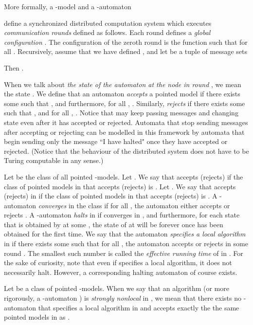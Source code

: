 \documentclass[copyright,creativecommons]{eptcs}
\begin{document}
More formally, a -model  
and a -automaton

define a
synchronized distributed computation system which executes \emph{communication
rounds} defined as follows. Each round  defines a \emph{global configuration} .
The configuration  of the zeroth round is the function  such that 
for all .
Recursively, assume that we have defined ,
and let 
be a tuple of message sets 

Then
.




When we talk about \emph{the state of the automaton  at the node  in round }, we mean
the state . We define that an automaton  \emph{accepts} a
pointed model  if there exists some 
such that , and furthermore, for all , .
Similarly,  \emph{rejects}  if there exists some 
such that , and for all , . 
Notice that  may keep passing messages and changing state even after it has accepted or rejected.
Automata that stop sending messages after accepting or rejecting can be 
modelled in this framework by automata that begin sending only the message
``I have halted" once they have accepted or rejected.
(Notice that the behaviour of the distributed system does not
have to be Turing computable in any sense.)




Let  be the class of all pointed -models. Let .
We say that  accepts (rejects) 
if the class of pointed models in  that  accepts (rejects) is .
Let .
We say that  accepts (rejects)  in 
if the class of pointed models in  that  accepts (rejects) is .
A -automaton 
\emph{converges} in the class  if for all , the automaton  either
accepts or rejects .
A -automaton 
\emph{halts} in 
if  converges in , and furthermore,
for each state  that is obtained by 
at some , the state of  at 
will be  forever once  has been obtained for the first time.
We say that the automaton  \emph{specifies a local algorithm} in 
if there exists some  such that for all ,
the automaton  accepts or rejects  in some round .
The smallest such number  is called the \emph{effective running time} of  in .
For the sake of curiosity, note that even if  specifies a local algorithm, it
does not necessarily halt. However, a corresponding halting automaton of course exists.




Let  be a class of pointed -models.
When we say that an algorithm  (or more 
rigorously, a -automaton ) is \emph{strongly
nonlocal} in , we mean that there exists no -automaton
 that specifies a local algorithm in  and accepts
exactly the the same pointed models in  as .
\end{document}
